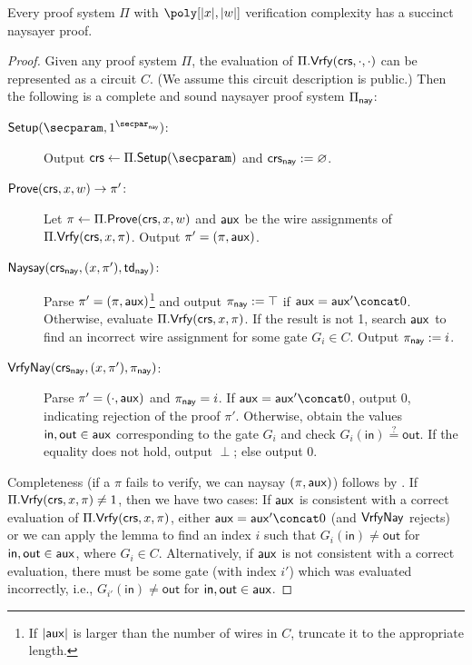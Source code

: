 \begin{theorem}\label{thm:naysayer}
    Every proof system $\Pi$ with $\poly[\sizeof{x}, \sizeof{\witness}]$ verification complexity has a succinct naysayer proof.
\end{theorem}
\begin{proof}
Given any proof system $\Pi$, the evaluation of $\Pi.\mathsf{Vrfy}(\mathsf{crs},\cdot,\cdot)$ can be represented as a circuit $C$. (We assume this circuit description is public.) 
Then the following is a complete and sound naysayer proof system $\Pi_{\mathsf{nay}}$:

\begin{description}
    \item[$\setup(\secparam, \naysecparam)$:] Output $\crs \gets \Pi.\setup(\secparam)$ and $\mathsf{crs}_{\mathsf{nay}} := \varnothing$.
    \item[$\mathsf{Prove}(\mathsf{crs}, x, w) \to \pi'$:] Let $\pi \gets \Pi.\mathsf{Prove}(\mathsf{crs}, x, w)$ and $\mathsf{aux}$ be the wire assignments of $\Pi.\mathsf{Vrfy}(\mathsf{crs}, x, \pi)$. Output $\pi' = (\pi, \mathsf{aux})$.
    \item[$\mathsf{Naysay}(\mathsf{crs}_{\mathsf{nay}}, (x, \pi'), \mathsf{td}_{\mathsf{nay}})$:] Parse $\pi' = (\pi, \mathsf{aux})$\footnote{If $\lvert \mathsf{aux} \rvert$ is larger than the number of wires in $C$, truncate it to the appropriate length.} and output $\pi_{\mathsf{nay}} := \top$ if $\aux = \aux' \concat 0$. Otherwise, evaluate $\Pi.\mathsf{Vrfy}(\mathsf{crs}, x, \pi)$. If the result is not 1, search $\mathsf{aux}$ to find an incorrect wire assignment for some gate $G_i \in C$. %
    Output $\pi_{\mathsf{nay}} := i$.
    \item[${\mathsf{Vrfy}}\mathsf{Nay}(\mathsf{crs}_{\mathsf{nay}}, (x, \pi'), \pi_{\mathsf{nay}})$:] Parse $\pi' = (\cdot, \mathsf{aux})$ and $\pi_{\mathsf{nay}} = i$. If $\aux = \aux' \concat 0$, output 0, indicating rejection of the proof $\pi'$. Otherwise, obtain the values $\mathsf{in},\mathsf{out} \in \mathsf{aux}$ corresponding to the gate $G_i$ %
    and check $G_i(\mathsf{in}) \stackrel{?}{=} \mathsf{out}$. If the equality does not hold, output $\perp$; else output 0.
\end{description}

Completeness (if a $\pi$ fails to verify, we can naysay $(\pi, \mathsf{aux})$) follows by . If $\Pi.\mathsf{Vrfy}(\mathsf{crs},x,\pi) \neq 1$, then we have two cases: If $\mathsf{aux}$ is consistent with a correct evaluation of $\Pi.\mathsf{Vrfy}(\mathsf{crs}, x, \pi)$, either $\aux = \aux' \concat 0$ (and ${\mathsf{Vrfy}}\mathsf{Nay}$ rejects) or we can apply the lemma to find an index $i$ such that $G_i(\mathsf{in}) \neq \mathsf{out}$ for $\mathsf{in}, \mathsf{out} \in \mathsf{aux}$, where $G_i \in C$. Alternatively, if $\mathsf{aux}$ is not consistent with a correct evaluation, there must be some gate (with index $i'$) which was evaluated incorrectly, i.e., $G_{i'}(\mathsf{in}) \neq \mathsf{out}$ for $\mathsf{in}, \mathsf{out} \in \mathsf{aux}$.


\end{proof}
